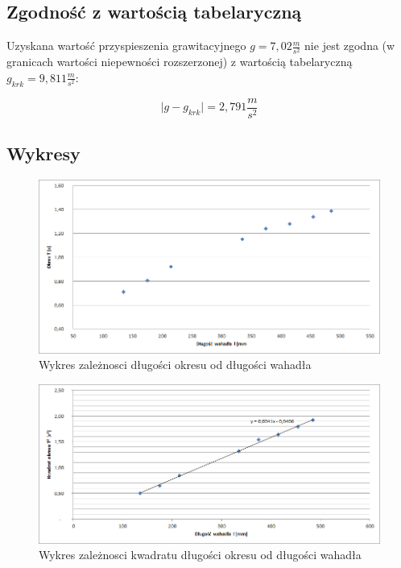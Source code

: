 \documentclass[a4paper,10pt,twoside]{article}
\begin{document}
\subsection{Zgodność z wartością tabelaryczną}

Uzyskana wartość przyspieszenia grawitacyjnego $g = 7,02 \unit{\frac{m}{s^2}}$ nie jest zgodna (w granicach wartości niepewności rozszerzonej) z wartością tabelaryczną $g_{krk} = 9,811 \unit{\frac{m}{s^2}}$:

$$\vert g - g_{krk} \vert = 2,791 \unit{\frac{m}{s^2}}$$

\newpage

\subsection{Wykresy}

\begin{figure}[!htp]
\centerline{\includegraphics[scale=1]{wykres1.png}}
\caption{Wykres zależnosci długości okresu od długości wahadła}
\label{fig:tl}
\end{figure}

\begin{figure}[!htp]
\centerline{\includegraphics[scale=1]{wykres2.png}}
\caption{Wykres zależnosci kwadratu długości okresu od długości wahadła}
\label{fig:ttl}
\end{figure}
\end{document}
